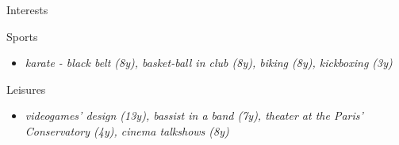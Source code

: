 \vspace{4mm}
\hspace*{-2mm}
{\fontsize{16}{10}\selectfont \hspace{1.5mm} Interests}
\newline \newline

\vspace{-8mm}
\hspace{-2mm}
{\fontsize{12}{10}\selectfont \hspace{3.8mm} Sports}\newline
\vspace{-6mm}
\begin{itemize}
    \item[\tiny\ding{110}] \textit{karate - black belt (8y), basket-ball in club (8y), biking (8y), kickboxing (3y)}
\end{itemize}

\hspace{-2mm}
\vspace{-6mm}
{\fontsize{12}{10}\selectfont \hspace{3.8mm} Leisures}\newline
\begin{itemize}
    \item[\tiny\ding{110}] \textit{videogames' design (13y), bassist in a band (7y), theater at the Paris' Conservatory (4y), cinema talkshows (8y)}
\end{itemize}
